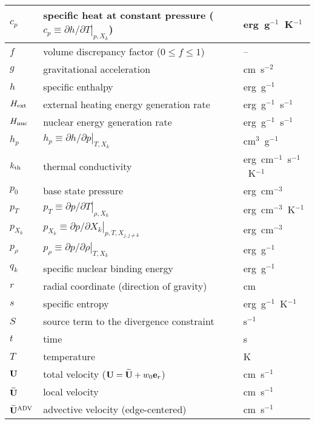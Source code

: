 \begin{center}
\begin{longtable}{|l|p{4.0in}|l|}
$c_p$   & specific heat at constant pressure
          ($c_p \equiv \left . \partial h / \partial T \right |_{p,X_k}$)
        & erg~g$^{-1}$~K$^{-1}$ \\
\hline
$f$     & volume discrepancy factor ($0 \le f \le 1$) & -- \\
\hline
$g$     & gravitational acceleration                 & cm~s$^{-2}$ \\
\hline
$h$     & specific enthalpy                          & erg~g$^{-1}$ \\
\hline
${H_{\rm ext}}$ & external heating energy generation rate    & erg~g$^{-1}$~s$^{-1}$ \\
\hline
${H_{\rm nuc}}$ & nuclear energy generation rate             & erg~g$^{-1}$~s$^{-1}$ \\
\hline
$h_p$   & $h_p \equiv \left . \partial h / \partial p \right |_{T,X_k}$ & cm$^{3}$~g$^{-1}$ \\
\hline
$k_{\rm th}$  & thermal conductivity                       & erg~cm$^{-1}$~s$^{-1}$~K$^{-1}$ \\
\hline
$p_0$   & base state pressure                        & erg~cm$^{-3}$ \\
\hline
$p_T$   & $p_T \equiv \left . \partial p / \partial T \right |_{\rho,X_k}$ & erg~cm$^{-3}$~K$^{-1}$ \\
\hline
$p_{X_k}$ & $p_{X_k} \equiv \left . \partial p / \partial X_k \right |_{p,T,X_{j,j\ne k}}$ & erg~cm$^{-3}$ \\
\hline
$p_\rho$ & $p_\rho \equiv \left . \partial p / \partial \rho \right |_{T,X_k}$ & erg~g$^{-1}$ \\
\hline
$q_k$   & specific nuclear binding energy            & erg~g$^{-1}$  \\
\hline
$r$     & radial coordinate (direction of gravity)   & cm \\
\hline
$s$     & specific entropy                           & erg~g$^{-1}$~K$^{-1}$ \\
\hline
$S$     & source term to the divergence constraint   & s$^{-1}$ \\
\hline
$t$     & time                                       & s \\
\hline
$T$     & temperature                                & K \\
\hline
${\bf U}$     & total velocity (${\bf U} = \widetilde{{\bf U}} + w_0 \mathbf{e}_r$) & cm~s$^{-1}$ \\
\hline
$\widetilde{{\bf U}}$   & local velocity                             & cm~s$^{-1}$ \\
\hline
$\widetilde{\mathbf{U}}^{\mathrm{ADV}}$ & advective velocity (edge-centered)         & cm~s$^{-1}$ \\

\end{longtable}
\end{center}
